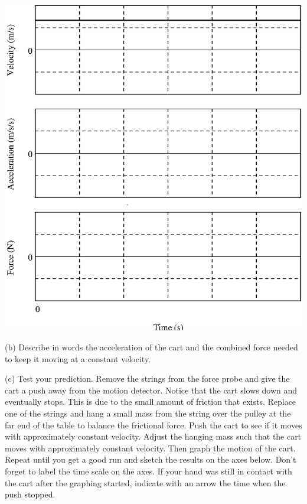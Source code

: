 \vspace{0.3cm}
{\par\centering \includegraphics{combining/combining_fig1.eps} \par}
\vspace{0.3cm}

(b) Describe in words the acceleration of the cart and the combined force needed
to keep it moving at a constant velocity.
\vspace{20mm}

(c) Test your prediction. Remove the strings from the force probe and give the
cart a push away from the motion detector. Notice that the cart slows down and
eventually stops. This is due to the small amount of friction that exists. Replace
one of the strings and hang a small mass from the string over the pulley at
the far end of the table to balance the frictional force. Push the cart to see
if it moves with approximately constant velocity. Adjust the hanging mass such
that the cart moves with approximately constant velocity. Then graph the motion
of the cart. Repeat until you get a good run and sketch the results on the axes
below. Don't forget to label the time scale on the axes. If your hand was still
in contact with the cart after the graphing started, indicate with an arrow
the time when the push stopped.

